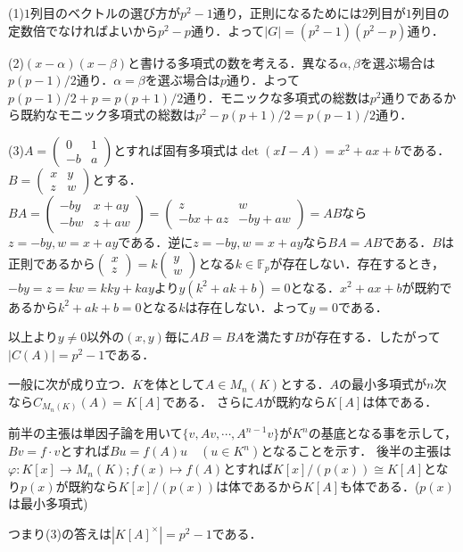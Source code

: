 \documentclass[
		book,
		head_space=20mm,
		foot_space=20mm,
		gutter=10mm,
		line_length=190mm
]{jlreq}
\begin{document}
(1)$1$列目のベクトルの選び方が$p^2-1$通り，正則になるためには$2$列目が$1$列目の定数倍でなければよいから$p^2-p$通り．よって$|G|=(p^2-1)(p^2-p)$通り．

(2)$(x-\alpha)(x-\beta)$と書ける多項式の数を考える．異なる$\alpha,\beta$を選ぶ場合は$p(p-1)/2$通り．$\alpha=\beta$を選ぶ場合は$p$通り．よって$p(p-1)/2+p=p(p+1)/2$通り．モニックな多項式の総数は$p^2$通りであるから既約なモニック多項式の総数は$p^2-p(p+1)/2=p(p-1)/2$通り．

(3)$A=\begin{pmatrix}
0 & 1 \\
-b & a
\end{pmatrix}$とすれば固有多項式は$\det (xI-A)=x^2+ax+b$である．
$B=\begin{pmatrix}
x & y \\
z & w
\end{pmatrix}$とする．$BA=\begin{pmatrix}
    -by & x+ay \\
    -bw & z+aw
\end{pmatrix}=\begin{pmatrix}
    z & w \\
    -bx+az & -by+aw
    \end{pmatrix}=AB$なら$z=-by,w=x+ay$である．逆に$z=-by,w=x+ay$なら$BA=AB$である．$B$は正則であるから$\begin{pmatrix}
    x \\
    z
    \end{pmatrix}=k\begin{pmatrix}
    y\\
    w
    \end{pmatrix}$となる$k \in \mathbb{F}_p$が存在しない．存在するとき，$-by=z=kw=kky+kay$より$y(k^2+ak+b)=0$となる．$x^2+ax+b$が既約であるから$k^2+ak+b=0$となる$k$は存在しない．よって$y=0$である．

    以上より$y\neq 0$以外の$(x,y)$毎に$AB=BA$を満たす$B$が存在する．したがって$|C(A)|=p^2-1$である．

\begin{tcolorbox}[blanker,breakable,
	left=3mm,right=3mm,
	top=3mm,bottom=3mm,
	before skip=15pt,after skip=15pt,
	borderline vertical={1pt}{0pt}{black,dotted}]
	一般に次が成り立つ．$K$を体として$A\in M_n(K)$とする．$A$の最小多項式が$n$次なら$C_{M_n(K)}(A)=K[A]$である．
    さらに$A$が既約なら$K[A]$は体である．

    前半の主張は単因子論を用いて$\{ v,Av,\cdots,A^{n-1}v \}$が$K^n$の基底となる事を示して，$Bv=f \cdot v$とすれば$Bu=f(A)u\quad(u \in K^n)$となることを示す．
    後半の主張は$\varphi\colon K[x]\rightarrow M_n(K);f(x)\mapsto f(A)$とすれば$K[x]/(p(x))\cong K[A]$となり$p(x)$が既約なら$K[x]/(p(x))$は体であるから$K[A]$も体である．($p(x)$は最小多項式)

    つまり(3)の答えは$|K[A]^\times|=p^2-1$である．
	\end{tcolorbox}
\end{document}
